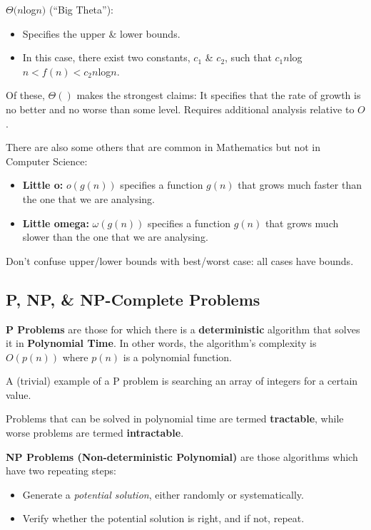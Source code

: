 \documentclass[11pt]{article}
\begin{document}
$\Theta(n$log$n)$ (``Big Theta''): 
\begin{itemize}
    \item   Specifies the upper \& lower bounds.
    \item   In this case, there exist two constants, $c_1$ \& $c_2$, such that $c_1n$log$n < f(n) < c_2n$log$n$.
\end{itemize}

Of these, $\Theta()$ makes the strongest claims: It specifies that the rate of growth is no better and no 
worse than some level. 
Requires additional analysis relative to $O$. 

There are also some others that are common in Mathematics but not in Computer Science: 
\begin{itemize}
    \item   \textbf{Little o:} $o(g(n))$ specifies a function $g(n)$ that grows much faster than the one 
            that we are analysing.
    \item   \textbf{Little omega:} $\omega(g(n))$ specifies a function $g(n)$ that grows much slower than 
            the one that we are analysing.
\end{itemize}

Don't confuse upper/lower bounds with best/worst case: all cases have bounds.

\newpage
\subsection{P, NP, \& NP-Complete Problems} 
\textbf{P Problems} are those for which there is a \textbf{deterministic} algorithm that solves it in 
\textbf{Polynomial Time}. 
In other words, the algorithm's complexity is $O(p(n))$ where $p(n)$ is a polynomial function.

A (trivial) example of a P problem is searching an array of integers for a certain value.

Problems that can be solved in polynomial time are termed \textbf{tractable}, while worse problems are 
termed \textbf{intractable}.

\textbf{NP Problems (Non-deterministic Polynomial)} are those algorithms which have two repeating steps: 
\begin{itemize}
    \item   Generate a \textit{potential solution}, either randomly or systematically. 
    \item   Verify whether the potential solution is right, and if not, repeat.
\end{itemize}
\end{document}
